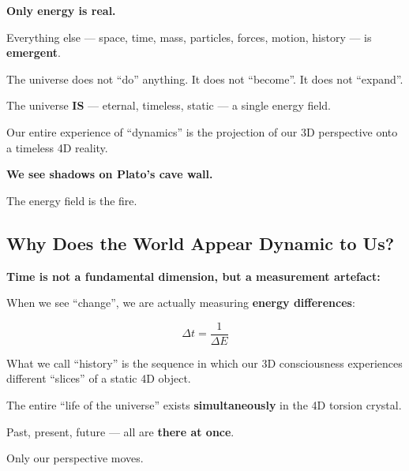 	\begin{philosophical}
		\textbf{Only energy is real.}
		
		\vspace{0.3cm}
		
		Everything else — space, time, mass, particles, forces, motion, history — is \textbf{emergent}.
		
		\vspace{0.3cm}
		
		The universe does not \enquote{do} anything. It does not \enquote{become}. It does not \enquote{expand}.
		
		\vspace{0.3cm}
		
		The universe \textbf{IS} — eternal, timeless, static — a single energy field.
		
		\vspace{0.3cm}
		
		Our entire experience of \enquote{dynamics} is the projection of our 3D perspective onto a timeless 4D reality.
		
		\vspace{0.3cm}
		
		\textbf{We see shadows on Plato’s cave wall.}
		
		\vspace{0.3cm}
		
		The energy field is the fire.
	\end{philosophical}
	
	\subsection{Why Does the World Appear Dynamic to Us?}
	
	\begin{important}
		\textbf{Time is not a fundamental dimension, but a measurement artefact:}
		
		\vspace{0.3cm}
		
		When we see \enquote{change}, we are actually measuring \textbf{energy differences}:
		
		\begin{equation}
			\Delta t = \frac{1}{\Delta E}
		\end{equation}
		
		\vspace{0.3cm}
		
		What we call \enquote{history} is the sequence in which our 3D consciousness experiences different \enquote{slices} of a static 4D object.
		
		\vspace{0.3cm}
		
		The entire \enquote{life of the universe} exists \textbf{simultaneously} in the 4D torsion crystal.
		
		\vspace{0.3cm}
		
		Past, present, future — all are \textbf{there at once}.
		
		Only our perspective moves.
	\end{important}
	
